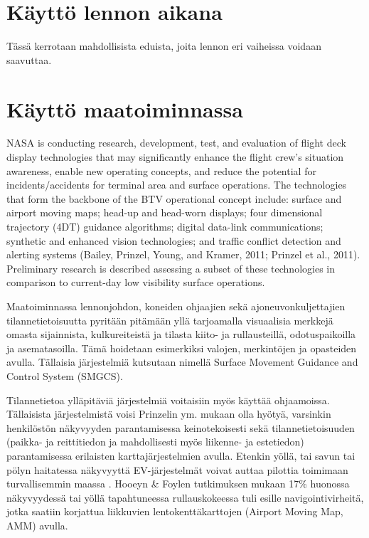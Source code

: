 \documentclass[utf8,bachelor,manualbib]{gradu3}
\begin{document}
\section{Käyttö lennon aikana}

Tässä kerrotaan mahdollisista eduista, joita lennon eri vaiheissa voidaan saavuttaa.

\section{Käyttö maatoiminnassa}

NASA is conducting research, development, test, and evaluation of flight deck display technologies that may significantly enhance the flight crew's situation awareness, enable new operating concepts, and reduce the potential for incidents/accidents for terminal area and surface operations. The technologies that form the backbone of the BTV operational concept include: surface and airport moving maps; head-up and head-worn displays; four dimensional trajectory (4DT) guidance algorithms; digital data-link communications; synthetic and enhanced vision technologies; and traffic conflict detection and alerting systems (Bailey, Prinzel, Young, and Kramer, 2011; Prinzel et al., 2011). Preliminary research is described assessing a subset of these technologies in comparison to current-day low visibility surface operations. \citep{prinzel2013}

Maatoiminnassa lennonjohdon, koneiden ohjaajien sekä ajoneuvonkuljettajien tilannetietoisuutta pyritään pitämään yllä tarjoamalla visuaalisia merkkejä omasta sijainnista, kulkureiteistä ja tilasta kiito- ja rullausteillä, odotuspaikoilla ja asematasoilla. Tämä hoidetaan esimerkiksi valojen, merkintöjen ja opasteiden avulla. Tällaisia järjestelmiä kutsutaan nimellä Surface Movement Guidance and Control System (SMGCS). \citep{prinzel2013}

Tilannetietoa ylläpitäviä järjestelmiä voitaisiin myös käyttää ohjaamoissa. Tällaisista järjestelmistä voisi Prinzelin ym. \citeyearpar{prinzel2013} mukaan olla hyötyä, varsinkin henkilöstön näkyvyyden parantamisessa keinotekoisesti sekä tilannetietoisuuden (paikka- ja reittitiedon ja mahdollisesti myös liikenne- ja estetiedon) parantamisessa erilaisten karttajärjestelmien avulla. Etenkin yöllä, tai savun tai pölyn haitatessa näkyvyyttä EV-järjestelmät voivat auttaa pilottia toimimaan turvallisemmin maassa \citep{prinzel2013}. Hooeyn \& Foylen \citeyearpar{hooey2007} tutkimuksen mukaan 17\% huonossa näkyvyydessä tai yöllä tapahtuneessa rullauskokeessa tuli esille navigointivirheitä, jotka saatiin korjattua liikkuvien lentokenttäkarttojen (Airport Moving Map, AMM) avulla.
\end{document}
